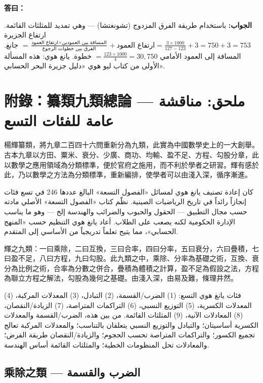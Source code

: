 \documentclass[11pt,a4paper]{article}
\newcommand{\ar}[1]{\arabicfont\beginR #1\endR}
\newcommand{\ChinCol}[1]{\begin{minipage}[t]{0.48\textwidth}#1\end{minipage}}
\newcommand{\ArabCol}[1]{\begin{minipage}[t]{0.48\textwidth}\arabicfont\beginR #1\endR\end{minipage}}
\newcommand{\parallelsection}[2]{%
  \noindent\ChinCol{#1}\hfill\ArabCol{#2}\par\vspace{0.5cm}%
}
\newcommand{\answer}[2]{\par\noindent%
  \begin{minipage}[t]{0.48\textwidth}\textbf{答曰：}#1\end{minipage}%
  \hfill%
  \begin{minipage}[t]{0.48\textwidth}\arabicfont\beginR\textbf{الجواب:} #2\endR\end{minipage}\par\vspace{0.2cm}}
\begin{document}
\answer{}{باستخدام طريقة الفرق المزدوج (تشونغتشا) --- وهي تمديد للمثلثات القائمة. ارتفاع الجزيرة $= \frac{\text{ارتفاع العمود} \times \text{المسافة بين العمودين}}{\text{الفرق بين خطوات الرجوع}} + \text{ارتفاع العمود} = \frac{3 \times 1000}{127-123} + 3 = 750 + 3 = 753$ جانغ. المسافة إلى العمود الأمامي $= \frac{123 \times 1000}{4} = 30{,}750$ خطوة. يانغ هوي: هذه المسألة الأولى من كتاب ليو هوي «دليل جزيرة البحر الحسابي».}

\newpage


\section*{附錄：纂類九類總論 --- \ar{ملحق: مناقشة عامة للفئات التسع}}

\parallelsection{%
楊輝纂類，將九章二百四十六問重新分為九類，此實為中國數學史上的一大創舉。古本九章以方田、粟米、衰分、少廣、商功、均輸、盈不足、方程、勾股分章，此以數學之應用領域為分類標準，便於官府之施用，而不利於學者之研習。輝有感於此，乃以數學之方法為分類標準，重新編排，使學者可以由淺入深，循序漸進。
}{%
كان إعادة تصنيف يانغ هوي لمسائل «الفصول التسعة» البالغ عددها 246 في تسع فئات إنجازاً رائداً في تاريخ الرياضيات الصينية. نظّم كتاب «الفصول التسعة» الأصلي مادته حسب مجال التطبيق --- الحقول والحبوب والضرائب والهندسة إلخ --- وهو ما يناسب الإدارة الحكومية لكنه يصعب على الطلاب. أعاد يانغ هوي التنظيم حسب «المنهج الحسابي»، مما يتيح تعلماً تدريجياً من الأساسي إلى المتقدم.
}

\parallelsection{%
輝之九類：一曰乘除，二曰互換，三曰合率，四曰分率，五曰衰分，六曰疊積，七曰盈不足，八曰方程，九曰勾股。此九類之中，乘除、分率為基礎之術，互換、衰分為比例之術，合率為分數之併合，疊積為體積之計算，盈不足為假設之法，方程為聯立方程之解法，勾股為幾何之基礎。由淺入深，由易及難，條理井然。
}{%
فئات يانغ هوي التسع: (1) الضرب/القسمة، (2) التبادل، (3) المعدلات المركبة، (4) المعدلات الكسرية، (5) التوزيع النسبي، (6) التراكمات المتراصة، (7) الزيادة/النقصان، (8) المعادلات الآنية، (9) المثلثات القائمة. من بين هذه، الضرب/القسمة والمعدلات الكسرية أساسيتان؛ والتبادل والتوزيع النسبي يتعلقان بالتناسب؛ والمعدلات المركبة تعالج تجميع الكسور؛ والتراكمات المتراصة تحسب الحجوم؛ والزيادة/النقصان طريقة الفرض؛ والمعادلات تحل المنظومات الخطية؛ والمثلثات القائمة أساس الهندسة.
}

\subsection*{乘除之類 --- \ar{الضرب والقسمة}}
\end{document}
